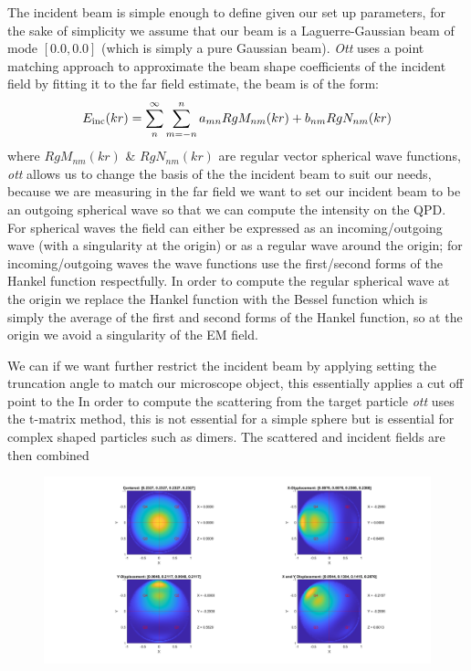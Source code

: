 The incident beam is simple enough to define given our set up parameters, for the sake of simplicity we assume that our beam is a Laguerre-Gaussian beam of mode $[0.0, 0.0]$ (which is simply a pure Gaussian beam). \textit{Ott} uses a point matching approach to approximate the beam shape coefficients of the incident field by fitting it to the far field estimate, the beam is of the form:
\begin{align}
	E_{\rm inc}(kr)=\sum^\infty_n\sum^n_{m=-n}a_{mn}RgM_{nm}(kr)+b_{nm}RgN_{nm}(kr)
\end{align}
where $RgM_{nm}(kr)$ \& $RgN_{nm}(kr)$ are regular vector spherical wave functions, \textit{ott} allows us to change the basis of the the incident beam to suit our needs, because we are measuring in the far field we want to set our incident beam to be an outgoing spherical wave so that we can compute the intensity on the QPD. For spherical waves the field can either be expressed as an incoming/outgoing wave (with a singularity at the origin) or as a regular wave around the origin; for incoming/outgoing waves the wave functions use the first/second forms of the Hankel function respectfully. In order to compute the regular spherical wave at the origin we replace the Hankel function with the Bessel function which is simply the average of the first and second forms of the Hankel function, so at the origin we avoid a singularity of the EM field.  

We can if we want further restrict the incident beam by applying setting the truncation angle to match our microscope object, this essentially applies a cut off point to the In order to compute the scattering from the target particle \textit{ott} uses the t-matrix method, this is not essential for a simple sphere but is essential for complex shaped particles such as dimers. The scattered and incident fields are then combined

\begin{figure}
	\centering
	\includegraphics[width=0.75\linewidth]{./figs/fixed_polarisation.png}
\end{figure}
